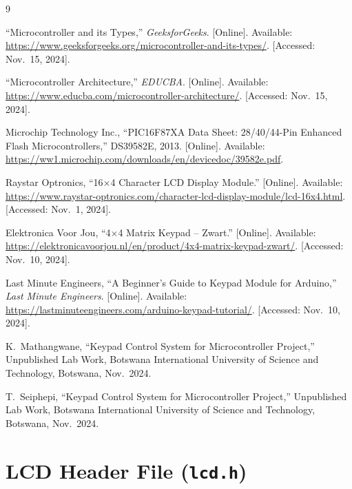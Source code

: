 \documentclass[11pt, a4paper]{report}
\begin{document}
\begin{thebibliography}{9}

``Microcontroller and its Types,'' \textit{GeeksforGeeks}. [Online].
Available: \url{https://www.geeksforgeeks.org/microcontroller-and-its-types/}.
[Accessed: Nov.\ 15, 2024].

``Microcontroller Architecture,'' \textit{EDUCBA}. [Online].
Available: \url{https://www.educba.com/microcontroller-architecture/}.
[Accessed: Nov.\ 15, 2024].

Microchip Technology Inc., ``PIC16F87XA Data Sheet: 28/40/44-Pin Enhanced
Flash Microcontrollers,'' DS39582E, 2013. [Online].
Available: \url{https://ww1.microchip.com/downloads/en/devicedoc/39582e.pdf}.

Raystar Optronics, ``16$\times$4 Character LCD Display Module.'' [Online].
Available:
\url{https://www.raystar-optronics.com/character-lcd-display-module/lcd-16x4.html}.
[Accessed: Nov.\ 1, 2024].

Elektronica Voor Jou, ``4$\times$4 Matrix Keypad -- Zwart.'' [Online].
Available:
\url{https://elektronicavoorjou.nl/en/product/4x4-matrix-keypad-zwart/}.
[Accessed: Nov.\ 10, 2024].

Last Minute Engineers, ``A Beginner's Guide to Keypad Module for Arduino,''
\textit{Last Minute Engineers}. [Online].
Available: \url{https://lastminuteengineers.com/arduino-keypad-tutorial/}.
[Accessed: Nov.\ 10, 2024].

K.\ Mathangwane, ``Keypad Control System for Microcontroller Project,''
Unpublished Lab Work, Botswana International University of Science and
Technology, Botswana, Nov.\ 2024.

T.\ Seiphepi, ``Keypad Control System for Microcontroller Project,''
Unpublished Lab Work, Botswana International University of Science and
Technology, Botswana, Nov.\ 2024.

\end{thebibliography}

\appendix

\chapter{LCD Header File (\texttt{lcd.h})}
\label{app:lcd}
\end{document}
